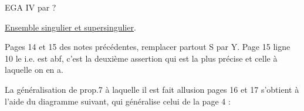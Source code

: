 \placedmargin{\unsure{//}}  

\placedmargin{\unsure{(}}EGA IV par ?

\uline{Ensemble singulier et supersingulier}.

Pages 14 et 15 des notes précédentes, remplacer partout S par Y. Page
15 ligne 10 le i.e. est abf, c'est la deuxième assertion qui est la
plus précise et celle à laquelle on en a.

La généralisation de prop.7 à laquelle il est fait allusion pages 16
et 17 s'obtient à l'aide du diagramme suivant, qui généralise celui de la
page 4 :

